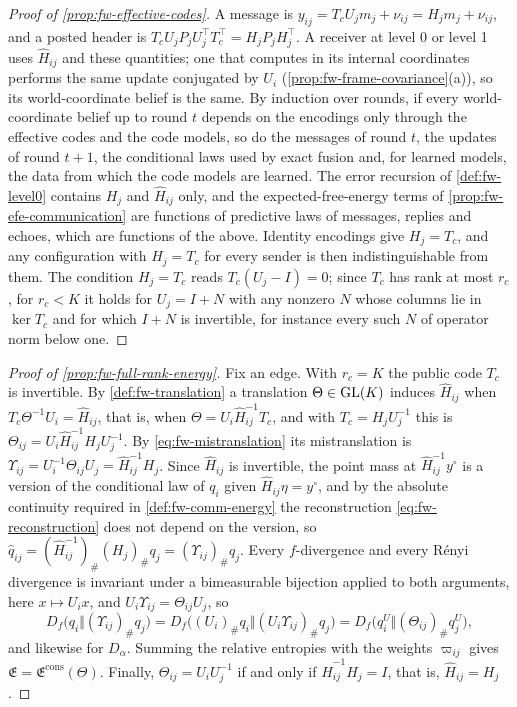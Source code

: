 \begin{proof}[Proof of \cref{prop:fw-effective-codes}]
A message is $y_{ij}=T_cU_jm_j+\nu_{ij}=H_jm_j+\nu_{ij}$, and a posted header is $T_cU_jP_jU_j^\top T_c^\top=H_jP_jH_j^\top$. A receiver at level 0 or level 1 uses $\hat H_{ij}$ and these quantities; one that computes in its internal coordinates performs the same update conjugated by $U_i$ (\cref{prop:fw-frame-covariance}(a)), so its world-coordinate belief is the same. By induction over rounds, if every world-coordinate belief up to round $t$ depends on the encodings only through the effective codes and the code models, so do the messages of round $t$, the updates of round $t+1$, the conditional laws used by exact fusion and, for learned models, the data from which the code models are learned. The error recursion of \cref{def:fw-level0} contains $H_j$ and $\hat H_{ij}$ only, and the expected-free-energy terms of \cref{prop:fw-efe-communication} are functions of predictive laws of messages, replies and echoes, which are functions of the above. Identity encodings give $H_j=T_c$, and any configuration with $H_j=T_c$ for every sender is then indistinguishable from them. The condition $H_j=T_c$ reads $T_c(U_j-I)=0$; since $T_c$ has rank at most $r_c$, for $r_c<K$ it holds for $U_j=I+N$ with any nonzero $N$ whose columns lie in $\ker T_c$ and for which $I+N$ is invertible, for instance every such $N$ of operator norm below one.
\end{proof}

\begin{proof}[Proof of \cref{prop:fw-full-rank-energy}]
Fix an edge. With $r_c=K$ the public code $T_c$ is invertible. By \cref{def:fw-translation} a translation $\Theta\in\mathrm{GL}(K)$ induces $\hat H_{ij}$ when $T_c\Theta^{-1}U_i=\hat H_{ij}$, that is, when $\Theta=U_i\hat H_{ij}^{-1}T_c$, and with $T_c=H_jU_j^{-1}$ this is $\Theta_{ij}=U_i\hat H_{ij}^{-1}H_jU_j^{-1}$. By \eqref{eq:fw-mistranslation} its mistranslation is $\Upsilon_{ij}=U_i^{-1}\Theta_{ij}U_j=\hat H_{ij}^{-1}H_j$. Since $\hat H_{ij}$ is invertible, the point mass at $\hat H_{ij}^{-1}y^\circ$ is a version of the conditional law of $q_i$ given $\hat H_{ij}\eta=y^\circ$, and by the absolute continuity required in \cref{def:fw-comm-energy} the reconstruction \eqref{eq:fw-reconstruction} does not depend on the version, so $\hat q_{ij}=(\hat H_{ij}^{-1})_\#(H_j)_\#q_j=(\Upsilon_{ij})_\#q_j$. Every $f$-divergence and every R\'enyi divergence is invariant under a bimeasurable bijection applied to both arguments, here $x\mapsto U_ix$, and $U_i\Upsilon_{ij}=\Theta_{ij}U_j$, so
\[
D_f\bigl(q_i\Vert(\Upsilon_{ij})_\#q_j\bigr)=D_f\bigl((U_i)_\#q_i\Vert(U_i\Upsilon_{ij})_\#q_j\bigr)=D_f\bigl(q^U_i\Vert(\Theta_{ij})_\#q^U_j\bigr),
\]
and likewise for $D_\alpha$. Summing the relative entropies with the weights $\varpi_{ij}$ gives $\mathfrak E=\mathfrak E^{\mathrm{cons}}(\Theta)$. Finally, $\Theta_{ij}=U_iU_j^{-1}$ if and only if $\hat H_{ij}^{-1}H_j=I$, that is, $\hat H_{ij}=H_j$.
\end{proof}

